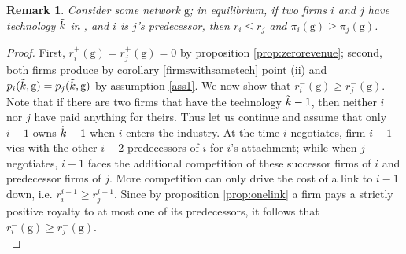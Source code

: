\documentclass{article}
\newtheorem{remark}{Remark}
\begin{document}
\begin{remark}
Consider some network $\text{g}$; in equilibrium, if two firms $i$ and $j$ have technology $\Tilde{k}$ in , and $i$ is $j$'s predecessor, then $r_i\leq r_j$ and $\pi_i(\text{g})\geq \pi_{j}(\text{g})$. 
\end{remark}
\begin{proof}
First, $r^{+}_i(\text{g})=r^{+}_j(\text{g})=0$ by proposition \ref{prop:zerorevenue}; second, both firms produce by corollary \ref{firmswithsametech} point (ii) and  $p_i(\Tilde{k},\text{g})=p_j(\Tilde{k},\text{g})$ by assumption \ref{ass1}. We now show that $r^{-}_i(\text{g})\geq r^{-}_j(\text{g})$. Note that if there are two firms that have the technology $\Tilde{k}-1$, then neither $i$ nor $j$ have paid anything for theirs. Thus let us continue and assume that only $i-1$ owns $\Tilde{k}-1$ when $i$ enters the industry. At the time $i$ negotiates, firm $i-1$ vies with the other $i-2$ predecessors of $i$ for $i$'s attachment; while when $j$ negotiates, $i-1$ faces the additional competition of these successor firms of $i$ and predecessor firms of $j$. More competition can only drive the cost of a link to $i-1$ down, i.e. $r^{i-1}_{i}\geq r^{i-1}_{j}$. Since by proposition \ref{prop:onelink} a firm pays a strictly positive royalty to at most one of its predecessors, it follows that $r^{-}_i(\text{g})\geq r^{-}_j(\text{g})$.\\ 
\end{proof}
\end{document}

